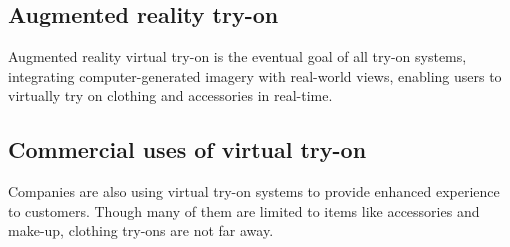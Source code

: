 	\subsection{Augmented reality try-on}
		Augmented reality virtual try-on is the eventual goal of all try-on systems, integrating computer-generated imagery with real-world views, enabling users to virtually try on clothing and accessories in real-time.
		
	\subsection{Commercial uses of virtual try-on}
		Companies are also using virtual try-on systems to provide enhanced experience to customers. Though many of them are limited to items like accessories and make-up, clothing try-ons are not far away.
